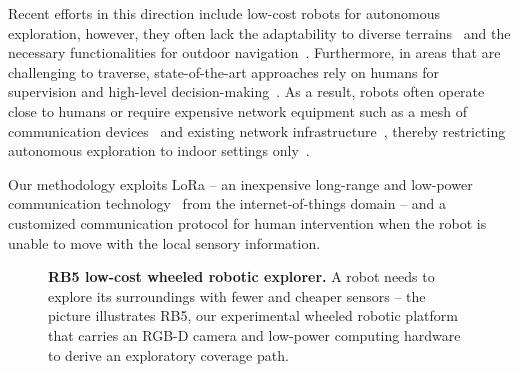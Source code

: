 \documentclass[letterpaper,10pt,conference,twoside]{IEEEtran}
\theoremstyle{definition}
\begin{document}
Recent efforts in this direction include low-cost robots for autonomous exploration, %
however, they often lack the adaptability to diverse terrains~\cite{muller2021openbot,srinivasa2019mushr} and the necessary functionalities for outdoor navigation~\cite{zhou2021smartphone,faisal2021low}.
%
Furthermore, in areas that are %
challenging to traverse, %
state-of-the-art approaches rely on humans for supervision and high-level decision-making~\cite{tranzatto2022cerberus,roucek2020darpa,tabib2022autonomous}. 
As a result, robots often operate close to humans or require expensive network equipment such as a mesh of communication devices~\cite{kulkarni2022autonomous,ebadi2020lamp} and existing network infrastructure~\cite{khairuldanial2019mobile,%
voigtlander20175g}, thereby restricting autonomous exploration to indoor settings only~\cite{delgado2022oros,
cadena2016past,eldemiry2022autonomous,corah2019communication
}.

Our methodology exploits LoRa -- an inexpensive long-range and low-power communication technology~\cite{shanmuga2020survey} from the
internet-of-things domain 
-- and a customized communication protocol 
for human intervention when %
the robot %
is unable to move with the local sensory information. 

\begin{figure}
     
   \caption[RB5 low-cost wheeled robotic explorer]{
     \textbf{RB5 low-cost wheeled robotic explorer. }
     A robot needs to explore its surroundings with fewer and cheaper sensors -- %
     the picture illustrates RB5, our experimental wheeled robotic platform that carries an RGB-D camera and low-power computing hardware to derive an exploratory coverage path. %
   }
   \vspace*{-.45cm}
   \label{fig:0}
 \end{figure}
\end{document}

